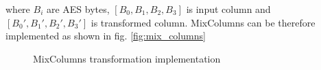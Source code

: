 where $B_i$ are AES bytes, $[B_0, B_1, B_2, B_3]$ is input column and $[B_0', B_1', B_2', B_3']$ is transformed column. MixColumns can be therefore implemented as shown in fig. \ref{fig:mix_columns}

\begin{figure}[!h]
\label{fig:missingfigure}
\caption{MixColumns transformation implementation}
\end{figure}



